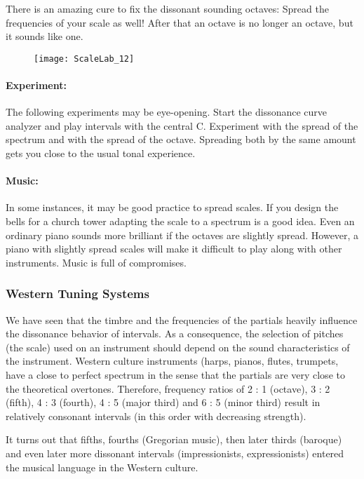 There is an amazing cure to fix the dissonant sounding octaves: Spread the frequencies of your scale as well! After that an octave is no longer an octave, but it sounds like one.

\begin{figure}[h]
\centering
\texttt{[image: ScaleLab\_12]}
\end{figure}

\paragraph{Experiment:}
The following experiments may be eye-opening. Start the dissonance curve analyzer and play intervals with the central C. Experiment with the spread of the spectrum and with the spread of the octave. Spreading both by the same amount gets you close to the usual tonal experience.

\paragraph{Music:}
In some instances, it may be good practice to spread scales. If you design the bells for a church tower adapting the scale to a spectrum is a good idea. Even an ordinary piano sounds more brilliant if the octaves are slightly spread. However, a piano with slightly spread scales will make it difficult to play along with other instruments. Music is full of compromises.

\subsubsection{Western Tuning Systems}
We have seen that the timbre and the frequencies of the partials heavily influence the dissonance behavior of intervals. As a consequence, the selection of pitches (the scale) used on an instrument should depend on the sound characteristics of the instrument. Western culture instruments (harps, pianos, flutes, trumpets, have a close to perfect spectrum in the sense that the partials are very close to the theoretical overtones. Therefore, frequency ratios of 2 : 1 (octave), 3 : 2 (fifth), 4 : 3 (fourth), 4 : 5 (major third) and 6 : 5 (minor third) result in relatively consonant intervals (in this order with decreasing strength).

It turns out that fifths, fourths (Gregorian music), then later thirds (baroque) and even later more dissonant intervals (impressionists, expressionists) entered the musical language in the Western culture.

